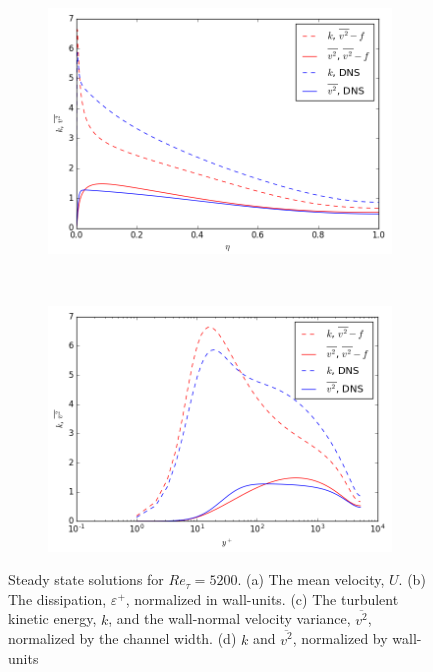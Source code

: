 \documentclass[a4paper,11pt]{article}
\begin{document}
\begin{figure}
	\begin{subfigure}[b]{0.45\textwidth} %
		\includegraphics[width=\textwidth]{k_y_5200}
		\caption{}
		\label{fig:results_v2_5200}
	\end{subfigure}
	~
	\begin{subfigure}[b]{0.45\textwidth} %
		\includegraphics[width=\textwidth]{k_yp_5200}
		\caption{}
		\label{fig:results_eps_5200}
	\end{subfigure}	
	\caption{Steady state solutions for $Re_\tau = 5200$. (a) The mean velocity, $U$. (b) The dissipation, $\varepsilon^+$, normalized in wall-units. (c) The turbulent kinetic energy, $k$, and the wall-normal velocity variance, $\overline{v^2}$, normalized by the channel width. (d) $k$ and $\overline{v^2}$, normalized by wall-units}
	\label{fig:Re5200_all}
\end{figure}
\end{document}
